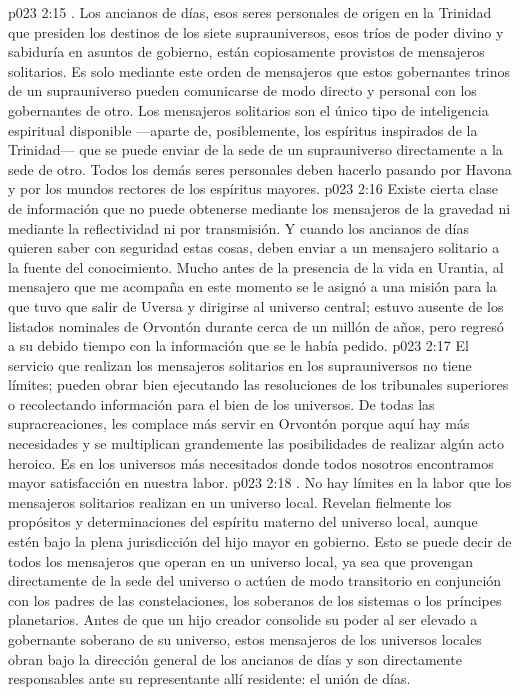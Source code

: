 \vs p023 2:15 . Los ancianos de días, esos seres personales de origen en la Trinidad que presiden los destinos de los siete suprauniversos, esos tríos de poder divino y sabiduría en asuntos de gobierno, están copiosamente provistos de mensajeros solitarios. Es solo mediante este orden de mensajeros que estos gobernantes trinos de un suprauniverso pueden comunicarse de modo directo y personal con los gobernantes de otro. Los mensajeros solitarios son el único tipo de inteligencia espiritual disponible ---aparte de, posiblemente, los espíritus inspirados de la Trinidad--- que se puede enviar de la sede de un suprauniverso directamente a la sede de otro. Todos los demás seres personales deben hacerlo pasando por Havona y por los mundos rectores de los espíritus mayores.
\vs p023 2:16 Existe cierta clase de información que no puede obtenerse mediante los mensajeros de la gravedad ni mediante la reflectividad ni por transmisión. Y cuando los ancianos de días quieren saber con seguridad estas cosas, deben enviar a un mensajero solitario a la fuente del conocimiento. Mucho antes de la presencia de la vida en Urantia, al mensajero que me acompaña en este momento se le asignó a una misión para la que tuvo que salir de Uversa y dirigirse al universo central; estuvo ausente de los listados nominales de Orvontón durante cerca de un millón de años, pero regresó a su debido tiempo con la información que se le había pedido.
\vs p023 2:17 El servicio que realizan los mensajeros solitarios en los suprauniversos no tiene límites; pueden obrar bien ejecutando las resoluciones de los tribunales superiores o recolectando información para el bien de los universos. De todas las supracreaciones, les complace más servir en Orvontón porque aquí hay más necesidades y se multiplican grandemente las posibilidades de realizar algún acto heroico. Es en los universos más necesitados donde todos nosotros encontramos mayor satisfacción en nuestra labor.
\vs p023 2:18 . No hay límites en la labor que los mensajeros solitarios realizan en un universo local. Revelan fielmente los propósitos y determinaciones del espíritu materno del universo local, aunque estén bajo la plena jurisdicción del hijo mayor en gobierno. Esto se puede decir de todos los mensajeros que operan en un universo local, ya sea que provengan directamente de la sede del universo o actúen de modo transitorio en conjunción con los padres de las constelaciones, los soberanos de los sistemas o los príncipes planetarios. Antes de que un hijo creador consolide su poder al ser elevado a gobernante soberano de su universo, estos mensajeros de los universos locales obran bajo la dirección general de los ancianos de días y son directamente responsables ante su representante allí residente: el unión de días.
